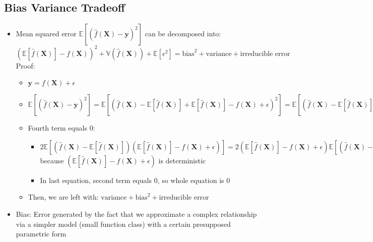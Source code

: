 \subsection*{Bias Variance Tradeoff}
\begin{itemize}
    \item Mean squared error $\mathbb{E}[ (\hat{f}(\boldsymbol{X}) - \boldsymbol{y})^2 ]$ can be decomposed into: $( \mathbb{E}[\hat{f}(\boldsymbol{X})] - f(\boldsymbol{X}) )^2 + \mathbb{V}(\hat{f}(\boldsymbol{X})) + \mathbb{E}[\epsilon^2] = \textrm{bias}^2 + \textrm{variance} + \textrm{irreducible error}$\\
    Proof:
    \begin{itemize}
        \item $\boldsymbol{y} = f(\boldsymbol{X}) + \epsilon$
        \item $\mathbb{E}[ (\hat{f}(\boldsymbol{X}) - \boldsymbol{y})^2 ] = \mathbb{E}[ (\hat{f}(\boldsymbol{X}) - \mathbb{E}[\hat{f}(\boldsymbol{X})] + \mathbb{E}[\hat{f}(\boldsymbol{X})] - f(\boldsymbol{X}) + \epsilon)^2 ] = \mathbb{E}[ (\hat{f}(\boldsymbol{X}) - \mathbb{E}[\hat{f}(\boldsymbol{X})] )^2 ] + \mathbb{E}[(\mathbb{E}[\hat{f}(\boldsymbol{X})] - f(\boldsymbol{X}))^2] + \mathbb{E}[\epsilon^2] - 2 \mathbb{E}[ (\hat{f}(\boldsymbol{X}) - \mathbb{E} [ \hat{f}(\boldsymbol{X}) ] ) ( \mathbb{E} [ \hat{f}(\boldsymbol{X}) ] - f(\boldsymbol{X}) + \epsilon ) ]$
        \item Fourth term equals 0:
        \begin{itemize}
            \item $2 \mathbb{E}[ (\hat{f}(\boldsymbol{X}) - \mathbb{E} [ \hat{f}(\boldsymbol{X}) ] ) ( \mathbb{E} [ \hat{f}(\boldsymbol{X}) ] - f(\boldsymbol{X}) + \epsilon ) ] = 2( \mathbb{E} [ \hat{f}(\boldsymbol{X}) ] - f(\boldsymbol{X}) + \epsilon ) \mathbb{E}[ (\hat{f}(\boldsymbol{X}) - \mathbb{E} [ \hat{f}(\boldsymbol{X}) ] ) ]$ because $( \mathbb{E} [ \hat{f}(\boldsymbol{X}) ] - f(\boldsymbol{X}) + \epsilon ) $ is deterministic
            \item In last equation, second term equals 0, so whole equation is 0
        \end{itemize}
        \item Then, we are left with: $\textrm{variance} + \textrm{bias}^2 + \textrm{irreducible error}$
    \end{itemize}
    \item Bias: Error generated by the fact that we approximate a complex relationship via a simpler model (small function class) with a certain presupposed parametric form

\end{itemize}
